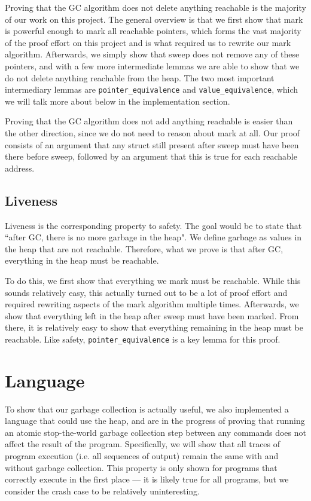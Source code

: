 \documentclass{article}
\begin{document}
Proving that the GC algorithm does not delete anything reachable is the majority of our work on this project. The general overview is that we first show that mark is powerful enough to mark all reachable pointers, which forms the vast majority of the proof effort on this project and is what required us to rewrite our mark algorithm. Afterwards, we simply show that sweep does not remove any of these pointers, and with a few more intermediate lemmas we are able to show that we do not delete anything reachable from the heap. The two most important intermediary lemmas are \lstinline|pointer_equivalence| and \lstinline|value_equivalence|, which we will talk more about below in the implementation section.

Proving that the GC algorithm does not add anything reachable is easier than the other direction, since we do not need to reason about mark at all. Our proof consists of an argument that any struct still present after sweep must have been there before sweep, followed by an argument that this is true for each reachable address. 

\subsection{Liveness}
Liveness is the corresponding property to safety. The goal would be to state that ``after GC, there is no more garbage in the heap". We define garbage as values in the heap that are not reachable. Therefore, what we prove is that after GC, everything in the heap must be reachable.

To do this, we first show that everything we mark must be reachable. While this sounds relatively easy, this actually turned out to be a lot of proof effort and required rewriting aspects of the mark algorithm multiple times. Afterwards, we show that everything left in the heap after sweep must have been marked. From there, it is relatively easy to show that everything remaining in the heap must be reachable. Like safety, \lstinline|pointer_equivalence| is a key lemma for this proof.

\section{Language}
To show that our garbage collection is actually useful, we also implemented a language that could use the heap, and are in the progress of proving that running an atomic stop-the-world garbage collection step between any commands does not affect the result of the program. Specifically, we will show that all traces of program execution (i.e. all sequences of output) remain the same with and without garbage collection. This property is only shown for programs that correctly execute in the first place --- it is likely true for all programs, but we consider the crash case to be relatively uninteresting.
\end{document}
